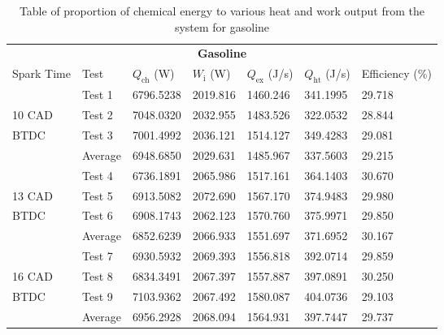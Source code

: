 \begin{table}[H]
    \begin{center}
        \begin{tabular}{@{}l l l l l l l@{}}
            \toprule
            \multicolumn{7}{c}{\textbf{Gasoline}}                                                                                             \\
            Spark Time & Test    & $Q_\textrm{ch}$ (W) & $W_\textrm{i}$ (W) & $Q_\textrm{ex}$ (J/s) & $Q_\textrm{ht}$ (J/s) & Efficiency (\%) \\
            \midrule
                       & Test 1  & 6796.5238           & 2019.816           & 1460.246              & 341.1995              & 29.718          \\
            10 CAD     & Test 2  & 7048.0320           & 2032.955           & 1483.526              & 322.0532              & 28.844          \\
            BTDC       & Test 3  & 7001.4992           & 2036.121           & 1514.127              & 349.4283              & 29.081          \\
                       & Average & 6948.6850           & 2029.631           & 1485.967              & 337.5603              & 29.215          \\
                       & Test 4  & 6736.1891           & 2065.986           & 1517.161              & 364.1403              & 30.670          \\
            13 CAD     & Test 5  & 6913.5082           & 2072.690           & 1567.170              & 374.9483              & 29.980          \\
            BTDC       & Test 6  & 6908.1743           & 2062.123           & 1570.760              & 375.9971              & 29.850          \\
                       & Average & 6852.6239           & 2066.933           & 1551.697              & 371.6952              & 30.167          \\
                       & Test 7  & 6930.5932           & 2069.393           & 1556.818              & 392.0714              & 29.859          \\
            16 CAD     & Test 8  & 6834.3491           & 2067.397           & 1557.887              & 397.0891              & 30.250          \\
            BTDC       & Test 9  & 7103.9362           & 2067.492           & 1580.087              & 404.0736              & 29.103          \\
                       & Average & 6956.2928           & 2068.094           & 1564.931              & 397.7447              & 29.737          \\
            \bottomrule
        \end{tabular}
        \caption{Table of proportion of chemical energy to various heat and work output from the system for gasoline}
        \label{q4-t1}
    \end{center}
\end{table}
